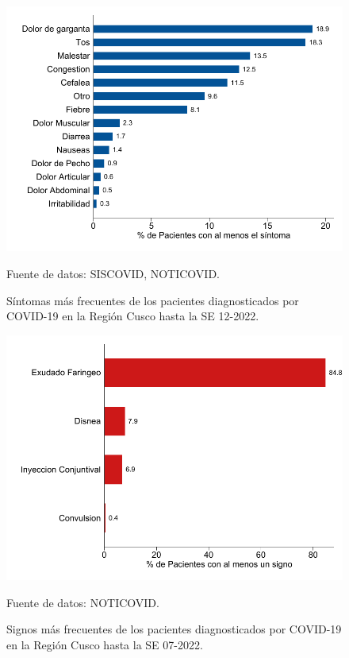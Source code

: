 \documentclass[12pt,a4paper,openany]{book}
\begin{document}
\begin{figure}[h]
	\caption{Síntomas más frecuentes de los pacientes diagnosticados por COVID-19 en la Región Cusco hasta la SE 12-2022.  }\label{fig:sintomas}
	\begin{center}
		\includegraphics[width=0.85\linewidth]{../figuras/figura_sintoma.pdf}
	\end{center}
	{\footnotesize {Fuente de datos: SISCOVID, NOTICOVID.}}
\end{figure}

\begin{figure}[h]
	\caption{Signos más frecuentes de los pacientes diagnosticados por COVID-19 en la Región Cusco hasta la SE 07-2022.}\label{fig:signos}
	\begin{center}
		\includegraphics[width=0.65\linewidth]{../figuras/figura_signo.pdf}
	\end{center}
	{\footnotesize {Fuente de datos: NOTICOVID.}}
\end{figure}
\end{document}
